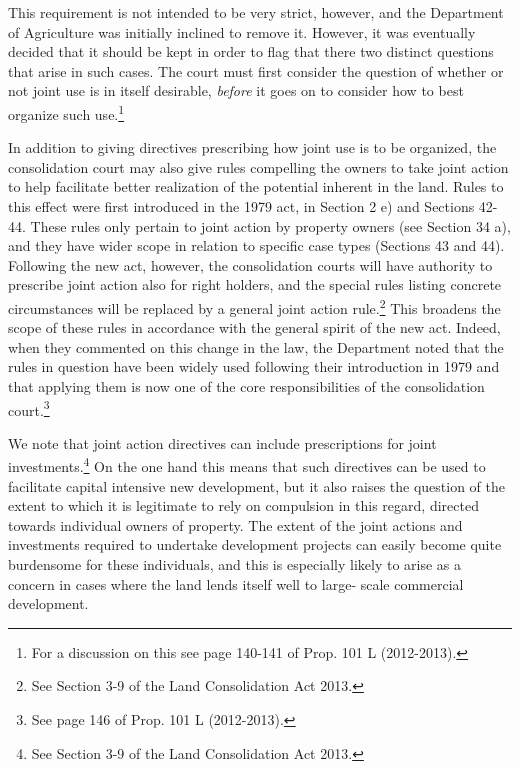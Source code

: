 \documentclass[10pt]{article} %
\begin{document}
This requirement is not intended to be very strict, however, and the Department of Agriculture was initially inclined to remove it. However, it was eventually decided that it should be kept in order to flag that there two distinct questions that arise in such cases. The court must first consider the question of whether or not joint use is in itself desirable, \emph{before} it goes on to consider how to best organize such use.\footnote{For a discussion on this see page 140-141 of Prop. 101 L (2012-2013).}

In addition to giving directives prescribing how joint use is to be organized, the consolidation court may also give rules compelling the owners to take joint action to help facilitate better realization of the potential inherent in the land. Rules to this effect were first introduced in the 1979 act, in Section 2 e) and Sections 42-44. These rules only pertain to joint action by property owners (see Section 34 a), and they have wider scope in relation to specific case types (Sections 43 and 44). Following the new act, however, the consolidation courts will have authority to prescribe joint action also for right holders, and the special rules listing concrete circumstances will be replaced by a general joint action rule.\footnote{See Section 3-9 of the Land Consolidation Act 2013.} This broadens the scope of these rules in accordance with the general spirit of the new act. Indeed, when they commented on this change in the law, the Department noted that the rules in question have been widely used following their introduction in 1979 and that applying them is now one of the core responsibilities of the consolidation court.\footnote{See page 146 of Prop. 101 L (2012-2013).}

We note that joint action directives can include prescriptions for joint investments.\footnote{See Section 3-9 of the Land Consolidation Act 2013.} On the one hand this means that such directives can be used to facilitate capital intensive new development, but it also raises the question of the extent to which it is legitimate to rely on compulsion in this regard, directed towards individual owners of property. The extent of the joint actions and investments required to undertake development projects can easily become quite burdensome for these individuals, and this is especially likely to arise as a concern in cases where the land lends itself well to large- scale commercial development.
\end{document}
